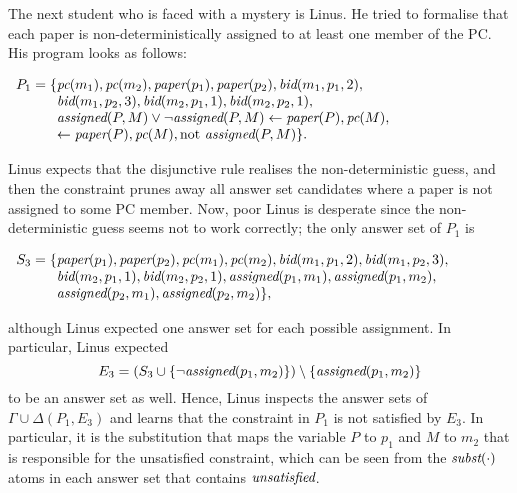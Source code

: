 \documentclass{tlp}
\newcommand{\reif}[1]{\Delta(#1)}
\newcommand{\naf}{\mathrm{not}}
\renewcommand{\mathit}[1]{{\text{\it{#1}}}}
\begin{document}
The next student who is faced with a mystery is Linus.
He tried to formalise that each paper is non-deterministically assigned to at least one member of the PC.
His program  looks as follows:
\begin{center}
$\begin{array}{r@{}l}
P_{1} = \{ & \mathit{pc}(m_1), \mathit{pc}(m_2), \mathit{paper}(p_1), \mathit{paper}(p_2), \mathit{bid}(m_1,p_1,2),\\
      &         \mathit{bid}(m_1,p_2,3),\mathit{bid}(m_2,p_1,1), \mathit{bid}(m_2,p_2,1),
              \\
         &   \mathit{assigned}(P,M) \vee \neg \mathit{assigned}(P,M) \leftarrow \mathit{paper}(P),
            \mathit{pc}(M),\\
&\leftarrow \mathit{paper}(P), \mathit{pc}(M), \naf\ \mathit{assigned}(P,M) \}\mbox{.}
\end{array}$
\end{center}

Linus expects that the disjunctive rule realises the non-deterministic guess, and then the constraint prunes away all answer set candidates
where a paper is not assigned to some PC member.
Now, poor Linus is  desperate since the non-deterministic guess seems not to work correctly; the only answer set  of $P_{1}$ is
\begin{center}
$\begin{array}{r@{}l}
S_{3} = \{ & 
 \mathit{paper}(p_1), \mathit{paper}(p_2), \mathit{pc}(m_1), \mathit{pc}(m_2), \mathit{bid}(m_1,p_1,2), \mathit{bid}(m_1,p_2,3),  \\& 
 \mathit{bid}(m_2,p_1,1), \mathit{bid}(m_2,p_2,1), \mathit{assigned}(p_1,m_1),  
  \mathit{assigned}(p_1,m_2), \\& 
  \mathit{assigned}(p_2,m_1), 
 \mathit{assigned}(p_2,m_2) \},
\end{array}$
\end{center}
although Linus expected one answer set for each possible assignment.
In particular, Linus expected 
$$E_{3} = (S_{3} \cup \{\neg\mathit{assigned}(p_1,m_2)\}) \setminus \{\mathit{assigned}(p_1,m_2)\}$$
to be an answer set as well. 
Hence, Linus inspects the answer sets of $\Gamma \cup \reif{P_{1},E_{3}}$ and learns that the constraint in $P_{1}$
is not satisfied by $E_{3}$. In particular, it is the substitution that maps the variable $P$ to $p_1$ and $M$ to $m_2$ that is responsible for 
the unsatisfied constraint, which can be
seen from the $\mathit{subst}(\cdot)$ atoms in each answer set that contains $\mathit{unsatisfied}$. 
\end{document}
